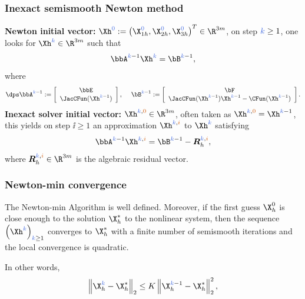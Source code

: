 %
\begin{frame}
\frametitle{Inexact semismooth Newton method}
\textcolor{cadmiumgreen}{\textbf{Newton initial vector:}} $\Xh^{\zzero} \egaldef \left(\X_{1h}^{\zzero},\X_{2h}^{\zzero}, \X_{3h}^{\zzero} \right)^{T} \in \R^{3 m}$, on step $\kk \geq 1$, one looks for $\Xh^{\kk} \in \R^{3 m}$ such that
\begin{equation*}
\bbA^{\kk-1}\Xh^{\kk}=\bB^{\kk-1},
\end{equation*} 
where 
\begin{equation*}
\dps \bbA^{\kk-1}\egaldef
\left[\begin{array}{c}
\bbE \\
\JacCFun(\Xh^{\kk-1})
\end{array}
\right],
\quad  \hspace{0.1 cm} \bB^{\kk-1} \egaldef
\left[\begin{array}{c}
\bF\\
\JacCFun(\Xh^{\kk-1})\Xh^{\kk-1}-\CFun(\Xh^{\kk-1})
\end{array}
\right].
\end{equation*}
\textcolor{cadmiumgreen}{\textbf{Inexact solver initial vector:}}
$\Xh^{\kk,\izzero} \in \R^{3 m}$, often taken as $\Xh^{\kk,\izzero} = \Xh^{\kk-1}$, this yields on step $\ii \geq 1$
an approximation $\Xh^{\kk,\ii}$ to $\Xh^{\kk}$ satisfying
\begin{equation*}
\bbA^{\kk-1}\Xh^{\kk,\ii} =\bB^{\kk-1}-{\bm R}_h^{\kk,\ii},
\end{equation*}
where ${\bm R}_h^{\kk,\ii} \in \R^{3 m}$ is the algebraic residual vector.
\end{frame}
\begin{frame}
  \frametitle{Newton-min convergence}
  \begin{theorem}
    The Newton-min Algorithm is well defined.
    Moreover, if the first guess $\X_h^0$  is close enough to the solution $\X_h^*$ to the nonlinear system, then the sequence $\left(\Xh^{\kk}\right)_{\kk \geq 1}$ converges to $\X_h^*$ with a finite number of semismooth iterations and the local convergence is quadratic.

    In other words,
    \begin{equation*}
\begin{split}
  \left\| \X_h^{\kk} - \X_h^* \right\|_2 \leq K \left\| \X_h^{\kk-1} - \X_h^* \right\|_2^2,
\end{split}
\end{equation*}
  \end{theorem}

  \end{frame}
